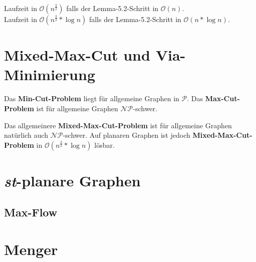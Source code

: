 \documentclass[10pt,a4paper]{article}
\begin{document}
Laufzeit in $\mathcal{O}(n^\frac{3}{2})$ falls der Lemma-5.2-Schritt in
$\mathcal{O}(n)$.\\
Laufzeit in $\mathcal{O}(n^\frac{3}{2} * \log n)$ falls der Lemma-5.2-Schritt
in $\mathcal{O}(n * \log n)$.


\clearpage
\section{Mixed-Max-Cut und Via-Minimierung}
Das \textbf{Min-Cut-Problem} liegt für allgemeine Graphen in $\mathcal{P}$.
Das \textbf{Max-Cut-Problem} ist für allgemeine Graphen $\mathcal{NP}$-schwer.

Das allgemeinere \textbf{Mixed-Max-Cut-Problem} ist für allgemeine Graphen
natürlich auch $\mathcal{NP}$-schwer.
Auf planaren Graphen ist jedoch \textbf{Mixed-Max-Cut-Problem} in
$\mathcal{O}(n^\frac{3}{2} * \log n)$ lösbar.


\clearpage
\section{\textit{st}-planare Graphen}
\subsection{Max-Flow}


\clearpage
\section{Menger}
\end{document}

